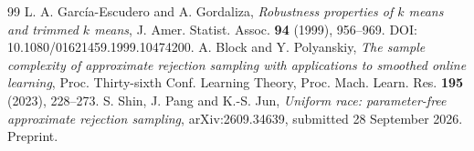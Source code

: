 \begin{thebibliography}{99}
 L. A. Garc\'ia-Escudero and A. Gordaliza, \emph{Robustness properties of $k$ means and trimmed $k$ means}, J. Amer. Statist. Assoc. \textbf{94} (1999), 956--969. DOI: 10.1080/01621459.1999.10474200.
 A. Block and Y. Polyanskiy, \emph{The sample complexity of approximate rejection sampling with applications to smoothed online learning}, Proc. Thirty-sixth Conf. Learning Theory, Proc. Mach. Learn. Res. \textbf{195} (2023), 228--273.
 S. Shin, J. Pang and K.-S. Jun, \emph{Uniform race: parameter-free approximate rejection sampling}, arXiv:2609.34639, submitted 28 September 2026. Preprint.
\end{thebibliography}
